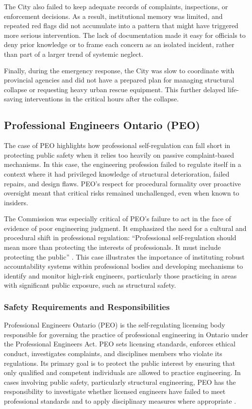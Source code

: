 \documentclass[12pt]{article}
\begin{document}
The City also failed to keep adequate records of complaints, inspections, or enforcement decisions. As a result, institutional memory was limited, and repeated red flags did not accumulate into a pattern that might have triggered more serious intervention. The lack of documentation made it easy for officials to deny prior knowledge or to frame each concern as an isolated incident, rather than part of a larger trend of systemic neglect.

Finally, during the emergency response, the City was slow to coordinate with provincial agencies and did not have a prepared plan for managing structural collapse or requesting heavy urban rescue equipment. This further delayed life-saving interventions in the critical hours after the collapse.

\subsection{Professional Engineers Ontario (PEO)}
The case of PEO highlights how professional self-regulation can fall short in protecting public safety when it relies too heavily on passive complaint-based mechanisms. In this case, the engineering profession failed to regulate itself in a context where it had privileged knowledge of structural deterioration, failed repairs, and design flaws. PEO's respect for procedural formality over proactive oversight meant that critical risks remained unchallenged, even when known to insiders.

The Commission was especially critical of PEO's failure to act in the face of evidence of poor engineering judgment. It emphasized the need for a cultural and procedural shift in professional regulation: ``Professional self-regulation should mean more than protecting the interests of professionals. It must include protecting the public'' \cite[p395]{AlgoLakeReport1}. This case illustrates the importance of instituting robust accountability systems within professional bodies and developing mechanisms to identify and monitor high-risk engineers, particularly those practicing in areas with significant public exposure, such as structural safety.

\subsubsection*{Safety Requirements and Responsibilities}

Professional Engineers Ontario (PEO) is the self-regulating licensing body responsible for governing the practice of professional engineering in Ontario under the Professional Engineers Act. PEO sets licensing standards, enforces ethical conduct, investigates complaints, and disciplines members who violate its regulations. Its primary goal is to protect the public interest by ensuring that only qualified and competent individuals are allowed to practice engineering. In cases involving public safety, particularly structural engineering, PEO has the responsibility to investigate whether licensed engineers have failed to meet professional standards and to apply disciplinary measures where appropriate \cite[p393-394]{AlgoLakeReport1}.
\end{document}
